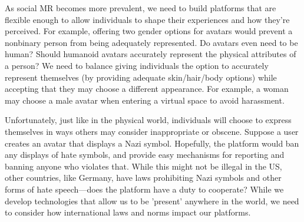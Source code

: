 As social MR becomes more prevalent, we need to build platforms that are flexible enough to allow individuals to shape their experiences and how they're perceived. For example, offering two gender options for avatars would prevent a nonbinary person from being adequately represented. Do avatars even need to be human? Should humanoid avatars accurately represent the physical attributes of a person? We need to balance giving individuals the option to accurately represent themselves (by providing adequate skin/hair/body options) while accepting that they may choose a different appearance. For example, a woman may choose a male avatar when entering a virtual space to avoid harassment.

Unfortunately, just like in the physical world, individuals will choose to express themselves in ways others may consider inappropriate or obscene. Suppose a user creates an avatar that displays a Nazi symbol. Hopefully, the platform would ban any displays of hate symbols, and provide easy mechanisms for reporting and banning anyone who violates that. While this might not be illegal in the US, other countries, like Germany, have laws prohibiting Nazi symbols and other forms of hate speech---does the platform have a duty to cooperate? While we develop technologies that allow us to be 'present' anywhere in the world, we need to consider how international laws and norms impact our platforms.



